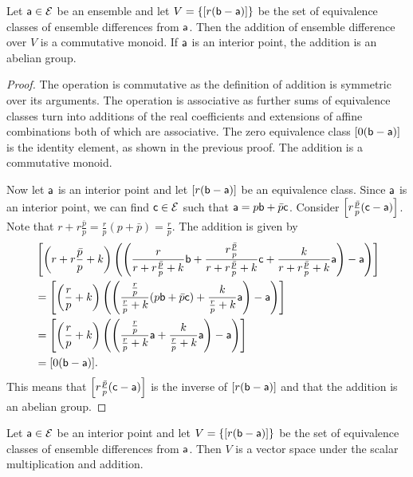 \begin{mathSection}
	\begin{coro}
		Let $\ens[a] \in \Ens$ be an ensemble and let $V = \{ [r(\ens[b]-\ens[a])] \}$ be the set of equivalence classes of ensemble differences from $\ens[a]$. Then the addition of ensemble difference over $V$ is a commutative monoid. If $\ens[a]$ is an interior point, the addition is an abelian group.
	\end{coro}
	
	\begin{proof}
		The operation is commutative as the definition of addition is symmetric over its arguments. The operation is associative as further sums of equivalence classes turn into additions of the real coefficients and extensions of affine combinations both of which are associative. The zero equivalence class $[0(\ens[b] - \ens[a])]$ is the identity element, as shown in the previous proof. The addition is a commutative monoid.
		
		Now let $\ens[a]$ is an interior point and let $[r(\ens[b] - \ens[a])]$ be an equivalence class. Since $\ens[a]$ is an interior point, we can find $\ens[c] \in \Ens$ such that $\ens[a] = p \ens[b] + \bar{p} \ens[c]$. Consider $\left[r\frac{\bar{p}}{p}(\ens[c] - \ens[a])\right]$. Note that $r + r\frac{\bar{p}}{p} = \frac{r}{p}(p+\bar{p}) = \frac{r}{p}$. The addition is given by
		\begin{equation}
			\begin{aligned}
				&\left[\left(r+r\frac{\bar{p}}{p}+k\right) \left(\left(\frac{r}{r+r\frac{\bar{p}}{p}+k}\ens[b] + \frac{r\frac{\bar{p}}{p}}{r+r\frac{\bar{p}}{p}+k} \ens[c] +\frac{k}{r+r\frac{\bar{p}}{p}+k} \ens[a] \right) - \ens[a]\right)\right] \\
				&=\left[\left(\frac{r}{p}+k\right) \left(\left(\frac{\frac{r}{p}}{\frac{r}{p}+k}(p\ens[b] + \bar{p} \ens[c]) +\frac{k}{\frac{r}{p}+k} \ens[a] \right) - \ens[a]\right)\right] \\
				&=\left[\left(\frac{r}{p}+k\right) \left(\left(\frac{\frac{r}{p}}{\frac{r}{p}+k}\ens[a] +\frac{k}{\frac{r}{p}+k} \ens[a] \right) - \ens[a]\right)\right] \\
				&= [0(\ens[b] - \ens[a])].
			\end{aligned}
		\end{equation}
		This means that $\left[r\frac{\bar{p}}{p}(\ens[c] - \ens[a])\right]$ is the inverse of $[r(\ens[b] - \ens[a])]$ and that the addition is an abelian group.
	\end{proof}
	
	\begin{thrm}
		Let $\ens[a] \in \Ens$ be an interior point and let $V = \{ [r(\ens[b]-\ens[a])] \}$ be the set of equivalence classes of ensemble differences from $\ens[a]$. Then $V$ is a vector space under the scalar multiplication and addition.
	\end{thrm}
	

\end{mathSection}
